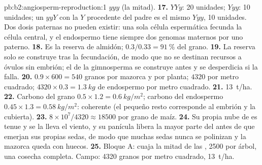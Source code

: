 \begin{solution}{pb:b2:angiosperm-reproduction:1}
$yyy$ (la mitad).
\textbf{17.} $YYy$: 20 unidades; $Yyy$: 10 unidades; un $yyY$ con la $Y$
procedente del padre es el mismo  $Yyy$, 10 unidades. Dos dosis
paternas no pueden existir: una sola célula espermática fecunda la célula
central, y el endospermo tiene siempre dos genomas maternos por uno
paterno.
\textbf{18.} Es la reserva de almidón; $0.3/0.33 = \qty{91}{\%}$ del
grano.
\textbf{19.} La reserva solo se construye tras la fecundación, de modo
que no se destinan recursos a óvulos sin embrión; el  de la
gimnosperma se construye antes y se desperdicia si la  falla.
\textbf{20.} $0.9\times 600 = 540$ granos por mazorca y por planta;
$4320$ por metro cuadrado; $4320\times 0.3 = \qty{1.3}{kg}$ de endospermo
por metro cuadrado.
\textbf{21.} \qty{13}{t/ha}.
\textbf{22.} Carbono del grano $0.5\times 1.2 = \qty{0.6}{kg/m^2}$;
carbono del endospermo $0.45\times 1.3 = \qty{0.58}{kg/m^2}$: coherente
(el pequeño resto corresponde al embrión y la cubierta).
\textbf{23.} $8\times 10^{7}/4320 \approx \num{18500}$ 
por grano de maíz.
\textbf{24.} Su propia nube de  es tenue y se la lleva el viento, y
su panícula libera la mayor parte del  antes de que emerjan sus
propias sedas, de modo que muchas sedas nunca se polinizan y la mazorca
queda con huecos.
\textbf{25.} Bloque A: cuaja la mitad de las , 2500  por
árbol, una cosecha completa. Campo: 4320 granos por metro cuadrado,
\qty{13}{t/ha}.
\end{solution}
